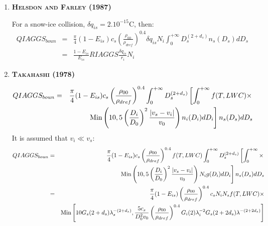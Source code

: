 \begin{enumerate}
  \item {\bf \textsc{Helsdon and Farley (1987)}}

For a snow-ice collision, $\delta q_{is} = 2.10^{-15}$C, then:
\begin{eqnarray}
  QIAGGS_{boun} &=& \frac{\pi}{4} (1 - E_{is}) c_s
                \left( \frac{\rho _{00}}{\rho _{dref}} \right) ^{0.4}
                \delta q_{is} N_i
                \int_0 ^{+ \infty} D_s ^{(2 + d_s)}  n_s (D_s) dD_s 
                \nonumber \\
                &=& \frac{1 - E_{is}}{E_{is}} RIAGGS 
                \frac{\delta q_{is}}{r_i} N_i
\end{eqnarray}

 \item {\bf\textsc{Takahashi (1978)}}

\begin{eqnarray}
  QIAGGS_{boun} &=& \frac{\pi}{4} (1 - E_{is}) c_s
                \left( \frac{\rho _{00}}{\rho _{dref}} \right) ^{0.4}
                \int_0 ^{+ \infty} D_s ^{(2 + d_s)}
                \left[ \int_0 ^{+ \infty} f(T,LWC) \times \right. \nonumber \\
                & & \left. {\rm Min} \left( 10, 5
                    \left( \frac{D_i}{D_0} \right) ^2
                    \frac{|v_s - v_i|}{v_0} \right) n_i (D_i) dD_i \right]
                n_s (D_s) dD_s \nonumber
\end{eqnarray}
It is assumed that $v_i \ll v_s$:
\begin{eqnarray}
  QIAGGS_{boun} &=& \frac{\pi}{4} (1 - E_{is}) c_s
                \left( \frac{\rho _{00}}{\rho _{dref}} \right) ^{0.4}
                f(T,LWC)
                \int_0 ^{+ \infty} D_s ^{(2 + d_s)}
                \left[ \int_0 ^{+ \infty} \times \right. \nonumber \\
                & & \left. {\rm Min} \left( 10, 5
                    \left( \frac{D_i}{D_0} \right) ^2
                    \frac{|v_s - v_i|}{v_0} \right) N_i g(D_i) dD_i \right]
                n_s (D_s) dD_s  \nonumber \\
                &=& \frac{\pi}{4} (1 - E_{is}) 
                \left( \frac{\rho _{00}}{\rho _{dref}} \right) ^{0.4}
                c_s N_i N_s f(T,LWC) \times \nonumber \\ 
                & & {\rm Min} \left[ 10 G_s (2 + d_s) \lambda _s ^{-(2 + d_s)},
                  \frac{5 c_s}{D_0 ^2 v_0} 
                  \left( \frac{\rho _{00}}{\rho _{dref}} \right) ^{0.4}
                  G_i (2) \lambda _i ^{-2} G_s (2 + 2d_s)
                  \lambda ^{-(2 + 2d_s)} \right] \nonumber \\
\end{eqnarray}


\end{enumerate}
